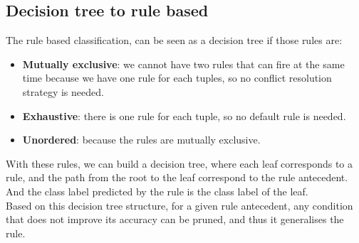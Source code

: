 \documentclass[12pt, openany]{report}
\theoremstyle{definition}
\begin{document}
\subsection{Decision tree to rule based}
The rule based classification, can be seen as a decision tree if those rules are:
\begin{itemize}
    \item \textbf{Mutually exclusive}: we cannot have two rules that can fire at the same time because we have one rule for each tuples, so no conflict resolution strategy is needed. 
    \item \textbf{Exhaustive}: there is one rule for each tuple, so no default rule is needed.
    \item \textbf{Unordered}: because the rules are mutually exclusive.
\end{itemize}
With these rules, we can build a decision tree, where each leaf corresponds to a rule, and the path from the root to the leaf correspond to the rule antecedent. And the class label predicted by the rule is the class label of the leaf.\\
Based on this decision tree structure, for a given rule antecedent, any condition that does not improve its accuracy can be pruned, and thus it generalises the rule. 
\end{document}
